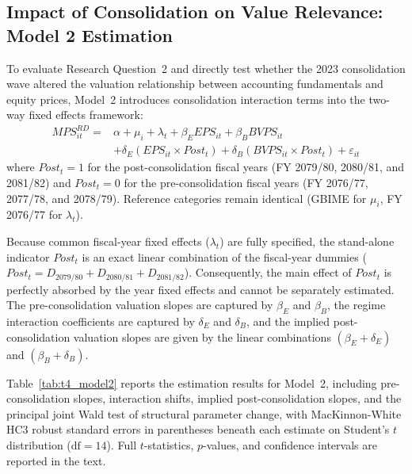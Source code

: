 \subsection{Impact of Consolidation on Value Relevance: Model 2 Estimation}
To evaluate Research Question~2 and directly test whether the 2023 consolidation wave altered the valuation relationship between accounting fundamentals and equity prices, Model~2 introduces consolidation interaction terms into the two-way fixed effects framework:
\begin{equation}
\begin{aligned}
\mathit{MPS}^{RD}_{it} ={}& \alpha + \mu_i + \lambda_t + \beta_E \mathit{EPS}_{it} + \beta_B \mathit{BVPS}_{it} \\
& + \delta_E (\mathit{EPS}_{it} \times \mathit{Post}_t) + \delta_B (\mathit{BVPS}_{it} \times \mathit{Post}_t) + \varepsilon_{it}
\end{aligned}
\end{equation}
where $\mathit{Post}_t = 1$ for the post-consolidation fiscal years (FY 2079/80, 2080/81, and 2081/82) and $\mathit{Post}_t = 0$ for the pre-consolidation fiscal years (FY 2076/77, 2077/78, and 2078/79). Reference categories remain identical (GBIME for $\mu_i$, FY 2076/77 for $\lambda_t$).

Because common fiscal-year fixed effects ($\lambda_t$) are fully specified, the stand-alone indicator $\mathit{Post}_t$ is an exact linear combination of the fiscal-year dummies ($\mathit{Post}_t = D_{2079/80} + D_{2080/81} + D_{2081/82}$). Consequently, the main effect of $\mathit{Post}_t$ is perfectly absorbed by the year fixed effects and cannot be separately estimated. The pre-consolidation valuation slopes are captured by $\beta_E$ and $\beta_B$, the regime interaction coefficients are captured by $\delta_E$ and $\delta_B$, and the implied post-consolidation valuation slopes are given by the linear combinations $(\beta_E + \delta_E)$ and $(\beta_B + \delta_B)$.

Table~\ref{tab:t4_model2} reports the estimation results for Model~2, including pre-consolidation slopes, interaction shifts, implied post-consolidation slopes, and the principal joint Wald test of structural parameter change, with MacKinnon-White HC3 robust standard errors in parentheses beneath each estimate on Student's $t$ distribution ($\text{df} = 14$). Full $t$-statistics, $p$-values, and confidence intervals are reported in the text.

